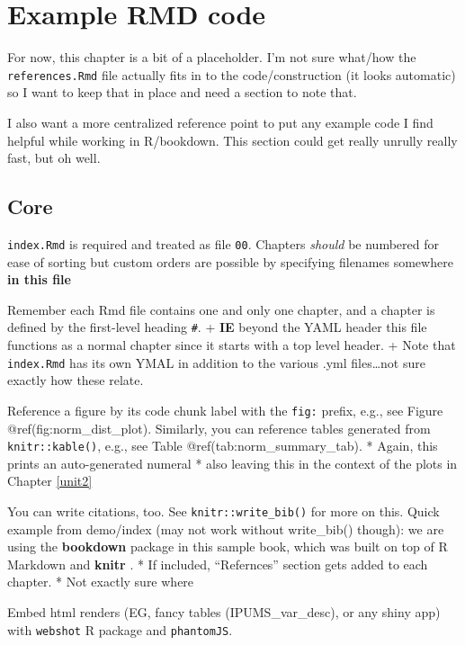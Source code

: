 \documentclass[
]{book}
\begin{document}
\hypertarget{ex_code}{%
\chapter{Example RMD code}\label{ex_code}}

For now, this chapter is a bit of a placeholder. I'm not sure what/how the \texttt{references.Rmd} file actually fits in to the code/construction (it looks automatic) so I want to keep that in place and need a section to note that.

I also want a more centralized reference point to put any example code I find helpful while working in R/bookdown. This section could get really unrully really fast, but oh well.

\hypertarget{core}{%
\section{Core}\label{core}}

\texttt{index.Rmd} is required and treated as file \texttt{00}. Chapters \emph{should} be numbered for ease of sorting but custom orders are possible by specifying filenames somewhere \textbf{in this file}

Remember each Rmd file contains one and only one chapter, and a chapter is defined by the first-level heading \texttt{\#}.
+ \textbf{IE} beyond the YAML header this file functions as a normal chapter since it starts with a top level header.
+ Note that \texttt{index.Rmd} has its own YMAL in addition to the various .yml files\ldots not sure exactly how these relate.

Reference a figure by its code chunk label with the \texttt{fig:} prefix, e.g., see Figure @ref(fig:norm\_dist\_plot). Similarly, you can reference tables generated from \texttt{knitr::kable()}, e.g., see Table @ref(tab:norm\_summary\_tab).
* Again, this prints an auto-generated numeral
* also leaving this in the context of the plots in Chapter \ref{unit2}

You can write citations, too. See \texttt{knitr::write\_bib()} for more on this. Quick example from demo/index (may not work without write\_bib() though): we are using the \textbf{bookdown} package \citep{R-bookdown} in this sample book, which was built on top of R Markdown and \textbf{knitr} \citep{xie2015}.
* If included, ``Refernces'' section gets added to each chapter.
* Not exactly sure where

Embed html renders (EG, fancy tables (IPUMS\_var\_desc), or any shiny app) with \texttt{webshot} R package and \texttt{phantomJS}.
\end{document}
